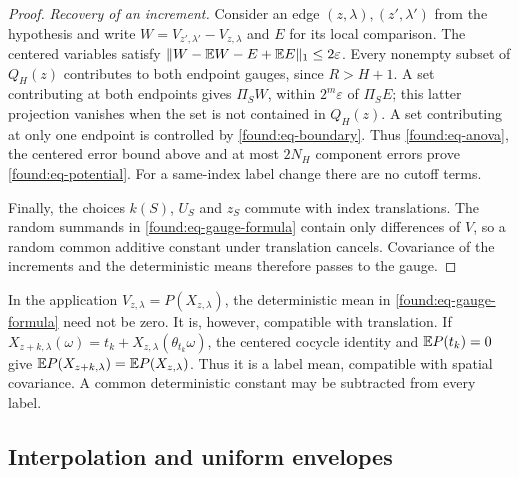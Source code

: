 \begin{proof}
\emph{Recovery of an increment.}
Consider an edge $(z,\lambda),(z',\lambda')$ from the hypothesis
and write $W=V_{z',\lambda'}-V_{z,\lambda}$ and $E$ for its local
comparison.  The centered variables satisfy
$\|W-\mathbb E W-E+\mathbb E E\|_1\leq2\varepsilon$.
Every nonempty subset of $Q_H(z)$ contributes to both endpoint
gauges, since $R>H+1$.  A set contributing at both endpoints gives
$\Pi_SW$, within $2^m\varepsilon$ of $\Pi_SE$; this latter projection
vanishes when the set is not contained in $Q_H(z)$.  A set contributing
at only one endpoint is controlled by \eqref{found:eq-boundary}.
Thus \eqref{found:eq-anova}, the centered error bound above and at
most $2N_H$ component errors prove \eqref{found:eq-potential}.
For a same-index label change there are no cutoff terms.

Finally, the choices $k(S)$, $U_S$ and $z_S$ commute with index
translations.  The random summands in \eqref{found:eq-gauge-formula}
contain only differences of $V$, so a random common additive constant
under translation cancels.  Covariance of the increments and the
deterministic means therefore passes to the gauge.
\end{proof}

\begin{remark}
\label{found:rem-means}
In the application $V_{z,\lambda}=P(X_{z,\lambda})$, the deterministic
mean in \eqref{found:eq-gauge-formula} need not be zero.  It is,
however, compatible with translation.  If
$X_{z+k,\lambda}(\omega)=t_k+X_{z,\lambda}(\theta_{t_k}\omega)$,
the centered cocycle identity and $\mathbb E P(t_k)=0$ give
$\mathbb E P(X_{z+k,\lambda})=\mathbb E P(X_{z,\lambda})$.
Thus it is a label mean, compatible with spatial covariance.  A common
deterministic constant may be subtracted from every label.
\end{remark}

\subsection{Interpolation and uniform envelopes}

